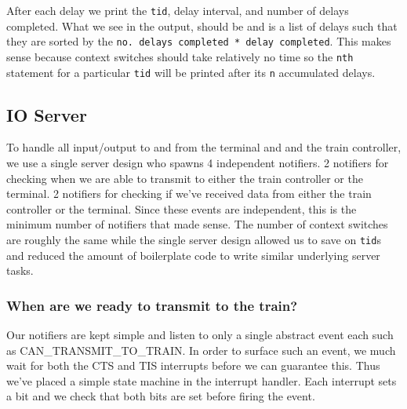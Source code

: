 \documentclass[letterpaper]{article}
\begin{document}
After each delay we print the \verb!tid!, delay interval, and number of delays completed. What we see in the output, should be and is a list of delays such that they are sorted by the \verb!no. delays completed * delay completed!. This makes sense because context switches should take relatively no time so the \verb!nth! statement for a particular \verb!tid! will be printed after its \verb!n! accumulated delays.

\subsection{IO Server}

To handle all input/output to and from the terminal and and the train controller, we use a single server design who spawns 4 independent notifiers. 2 notifiers for checking when we are able to transmit to either the train controller or the terminal. 2 notifiers for checking if we've received data from either the train controller or the terminal. Since these events are independent, this is the minimum number of notifiers that made sense. The number of context switches are roughly the same while the single server design allowed us to save on \verb!tid!s and reduced the amount of boilerplate code to write similar underlying server tasks.

\subsubsection{When are we ready to transmit to the train?}

Our notifiers are kept simple and listen to only a single abstract event each such as CAN\_TRANSMIT\_TO\_TRAIN. In order to surface such an event, we much wait for both the CTS and TIS interrupts before we can guarantee this. Thus we've placed a simple state machine in the interrupt handler. Each interrupt sets a bit and we check that both bits are set before firing the event. 
\end{document}
